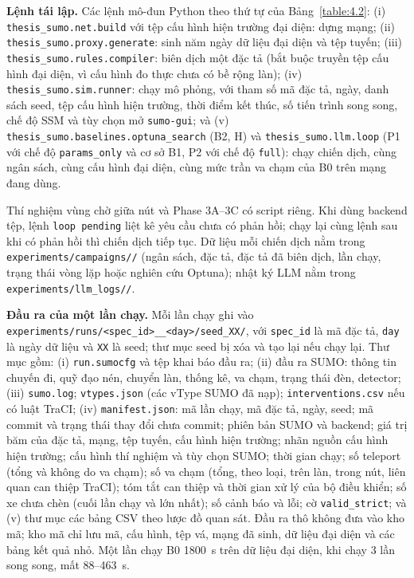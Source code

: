\documentclass[../main.tex]{subfiles}
\begin{document}
\begin{sloppypar}
\textbf{Lệnh tái lập.} Các lệnh mô-đun Python theo thứ tự của Bảng~\ref{table:4.2}: (i) \texttt{thesis\_sumo.net.build} với tệp cấu hình hiện trường đại diện: dựng mạng; (ii) \texttt{thesis\_sumo.proxy.generate}: sinh năm ngày dữ liệu đại diện và tệp tuyến; (iii) \texttt{thesis\_sumo.rules.compiler}: biên dịch một đặc tả (bắt buộc truyền tệp cấu hình đại diện, vì cấu hình đo thực chưa có bề rộng làn); (iv) \texttt{thesis\_sumo.sim.runner}: chạy mô phỏng, với tham số mã đặc tả, ngày, danh sách seed, tệp cấu hình hiện trường, thời điểm kết thúc, số tiến trình song song, chế độ SSM và tùy chọn mở \texttt{sumo-gui}; và (v) \texttt{thesis\_sumo.baselines.optuna\_search} (B2, H) và \texttt{thesis\_sumo.llm.loop} (P1 với chế độ \texttt{params\_only} và cơ sở B1, P2 với chế độ \texttt{full}): chạy chiến dịch, cùng ngân sách, cùng cấu hình đại diện, cùng mức trần va chạm của B0 trên mạng đang dùng.
\end{sloppypar}
Thí nghiệm vùng chờ giữa nút và Phase 3A--3C có script riêng. Khi dùng backend tệp, lệnh \texttt{loop pending} liệt kê yêu cầu chưa có phản hồi; chạy lại cùng lệnh sau khi có phản hồi thì chiến dịch tiếp tục. Dữ liệu mỗi chiến dịch nằm trong \texttt{experiments/\allowbreak campaigns//} (ngân sách, đặc tả, đặc tả đã biên dịch, lần chạy, trạng thái vòng lặp hoặc nghiên cứu Optuna); nhật ký LLM nằm trong \texttt{experiments/\allowbreak llm\_logs//}.

\textbf{Đầu ra của một lần chạy.} Mỗi lần chạy ghi vào \texttt{experiments/\allowbreak runs/\allowbreak <spec\_id>\_\_<day>/\allowbreak seed\_XX/}, với \texttt{spec\_id} là mã đặc tả, \texttt{day} là ngày dữ liệu và \texttt{XX} là seed; thư mục seed bị xóa và tạo lại nếu chạy lại. Thư mục gồm: (i) \texttt{run.sumocfg} và tệp khai báo đầu ra; (ii) đầu ra SUMO: thông tin chuyến đi, quỹ đạo nén, chuyển làn, thống kê, va chạm, trạng thái đèn, detector; (iii) \texttt{sumo.log}; \texttt{vtypes.json} (các vType SUMO đã nạp); \texttt{interventions.csv} nếu có luật TraCI; (iv) \texttt{manifest.json}: mã lần chạy, mã đặc tả, ngày, seed; mã commit và trạng thái thay đổi chưa commit; phiên bản SUMO và backend; giá trị băm của đặc tả, mạng, tệp tuyến, cấu hình hiện trường; nhãn nguồn cấu hình hiện trường; cấu hình thí nghiệm và tùy chọn SUMO; thời gian chạy; số teleport (tổng và không do va chạm); số va chạm (tổng, theo loại, trên làn, trong nút, liên quan can thiệp TraCI); tóm tắt can thiệp và thời gian xử lý của bộ điều khiển; số xe chưa chèn (cuối lần chạy và lớn nhất); số cảnh báo và lỗi; cờ \texttt{valid\_strict}; và (v) thư mục các bảng CSV theo lược đồ quan sát.
Đầu ra thô không đưa vào kho mã; kho mã chỉ lưu mã, cấu hình, tệp vá, mạng đã sinh, dữ liệu đại diện và các bảng kết quả nhỏ. Một lần chạy B0 1800~s trên dữ liệu đại diện, khi chạy 3 lần song song, mất 88--463~s.
\end{document}

